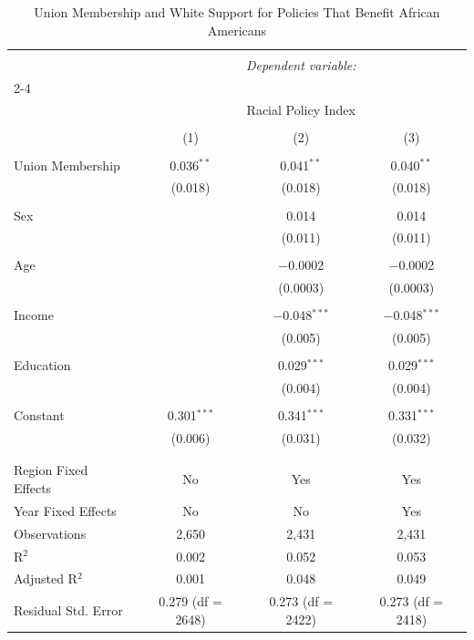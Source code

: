 \documentclass[12pt,letterpaper]{article}
\begin{document}
\begin{table}[H] \centering 
	\caption{Union Membership and White Support for Policies That Benefit African Americans} 
	\label{} 
	\begin{tabular}{@{\extracolsep{5pt}}lccc} 
		\\[-1.8ex]\hline 
		\hline \\[-1.8ex] 
		& \multicolumn{3}{c}{\textit{Dependent variable:}} \\ 
		\cline{2-4} 
		\\[-1.8ex] & \multicolumn{3}{c}{ Racial Policy Index} \\ 
		\\[-1.8ex] & (1) & (2) & (3)\\ 
		\hline \\[-1.8ex] 
		Union Membership & 0.036$^{**}$ & 0.041$^{**}$ & 0.040$^{**}$ \\ 
		& (0.018) & (0.018) & (0.018) \\ 
		& & & \\ 
		Sex &  & 0.014 & 0.014 \\ 
		&  & (0.011) & (0.011) \\ 
		& & & \\ 
		Age &  & $-$0.0002 & $-$0.0002 \\ 
		&  & (0.0003) & (0.0003) \\ 
		& & & \\ 
		Income &  & $-$0.048$^{***}$ & $-$0.048$^{***}$ \\ 
		&  & (0.005) & (0.005) \\ 
		& & & \\ 
		Education &  & 0.029$^{***}$ & 0.029$^{***}$ \\ 
		&  & (0.004) & (0.004) \\ 
		& & & \\ 
		Constant & 0.301$^{***}$ & 0.341$^{***}$ & 0.331$^{***}$ \\ 
		& (0.006) & (0.031) & (0.032) \\ 
		& & & \\ 
		\hline \\[-1.8ex] 
		Region Fixed Effects & No & Yes & Yes \\ 
		Year Fixed Effects & No & No & Yes \\ 
		Observations & 2,650 & 2,431 & 2,431 \\ 
		R$^{2}$ & 0.002 & 0.052 & 0.053 \\ 
		Adjusted R$^{2}$ & 0.001 & 0.048 & 0.049 \\ 
		Residual Std. Error & 0.279 (df = 2648) & 0.273 (df = 2422) & 0.273 (df = 2418) \\ 

\end{tabular}
\end{table}
\end{document}

